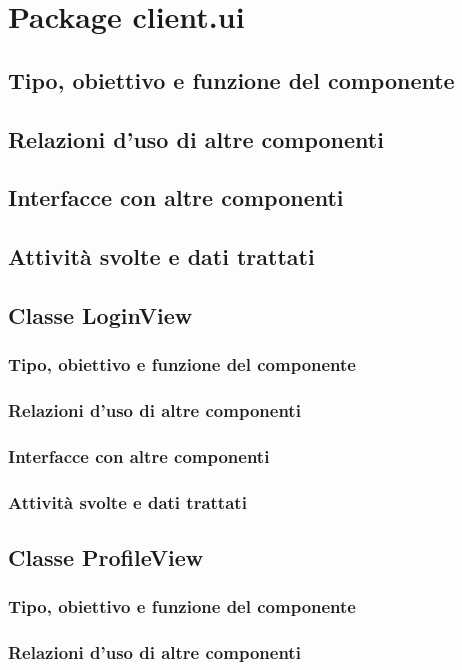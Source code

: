\newpage
\section{Package client.ui} %
\subsection*{Tipo, obiettivo e funzione del componente}
\subsection*{Relazioni d'uso di altre componenti}
\subsection*{Interfacce con altre componenti}
\subsection*{Attivit\`a svolte e dati trattati}

\subsection{Classe LoginView}
\subsubsection*{Tipo, obiettivo e funzione del componente}
\subsubsection*{Relazioni d'uso di altre componenti}
\subsubsection*{Interfacce con altre componenti}
\subsubsection*{Attivit\`a svolte e dati trattati}

\subsection{Classe ProfileView}
\subsubsection*{Tipo, obiettivo e funzione del componente}
\subsubsection*{Relazioni d'uso di altre componenti}
